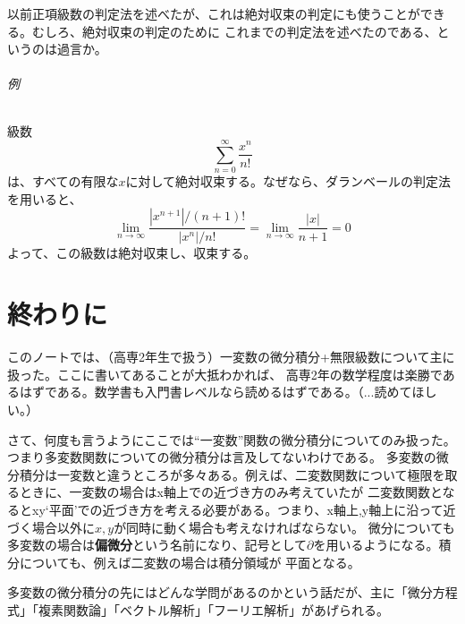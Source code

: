 \documentclass[a4j,dvipdfmx]{jsarticle}
\begin{document}
                以前正項級数の判定法を述べたが、これは絶対収束の判定にも使うことができる。むしろ、絶対収束の判定のために
                これまでの判定法を述べたのである、というのは過言か。

                \paragraph{例}級数
                \begin{equation*}
                    \sum_{n=0}^{\infty}\frac{x^n}{n!}
                \end{equation*}
                は、すべての有限な$x$に対して絶対収束する。なぜなら、ダランベールの判定法を用いると、
                \begin{equation*}
                    \lim_{n\to \infty}\frac{{|x^{n+1}|}/{(n+1)!}}{{|x^n|}/{n!}}=\lim_{n\to\infty}\frac{|x|}{n+1}=0
                \end{equation*}
                よって、この級数は絶対収束し、収束する。

                
                
    \clearpage
    \part{終わりに}
        このノートでは、（高専2年生で扱う）一変数の微分積分+無限級数について主に扱った。ここに書いてあることが大抵わかれば、
        高専2年の数学程度は楽勝であるはずである。数学書も入門書レベルなら読めるはずである。（...読めてほしい。）
        
        さて、何度も言うようにここでは``一変数''関数の微分積分についてのみ扱った。つまり多変数関数についての微分積分は言及してないわけである。
        多変数の微分積分は一変数と違うところが多々ある。例えば、二変数関数について極限を取るときに、一変数の場合はx軸上での近づき方のみ考えていたが
        二変数関数となるとxy`平面'での近づき方を考える必要がある。つまり、x軸上,y軸上に沿って近づく場合以外に$x,y$が同時に動く場合も考えなければならない。
        微分についても多変数の場合は\textbf{偏微分}という名前になり、記号として$\partial$を用いるようになる。積分についても、例えば二変数の場合は積分領域が
        平面となる。

        多変数の微分積分の先にはどんな学問があるのかという話だが、主に「微分方程式」「複素関数論」「ベクトル解析」「フーリエ解析」があげられる。\\
\end{document}
